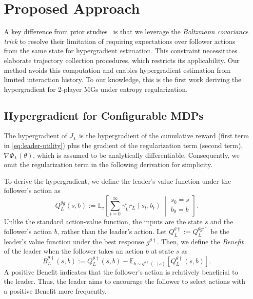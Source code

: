 \documentclass[letterpaper]{article} %
\providecommand{\E}{\mathbb{E}} %
\begin{document}

\section{Proposed Approach}

A key difference from prior studies~\citep{Thoma2024-em,Yang2025-lr} is that we leverage the \emph{Boltzmann covariance trick} to resolve their limitation of requiring expectations over follower actions from the same state for hypergradient estimation.
This constraint necessitates elaborate trajectory collection procedures, which restricts its applicability.
Our method avoids this computation and enables hypergradient estimation from limited interaction history. 
To our knowledge, this is the first work deriving the hypergradient for 2-player MGs under entropy regularization.

\subsection{Hypergradient for Configurable MDPs}

The hypergradient of $J_L$ is the hypergradient of the cumulative reward (first term in \eqref{eq:leader-utility}) plus the gradient of the regularization term (second term), $\nabla \Phi_L({\theta})$, which is assumed to be analytically differentiable. Consequently, we omit the regularization term in the following derivation for simplicity.

To derive the hypergradient, we define the leader's value function under the follower's action as 
\begin{equation*}
    Q_L^{{\theta} {g}}(s, b) :=\E_\tau\left[\sum_{t=0}^\infty\gamma_L^t r_L(s_t,b_t)~\middle|\begin{array}{l}s_0=s\\b_0=b\end{array}\right].
\end{equation*}
Unlike the standard action-value function, the inputs are the state $s$ and the follower's action $b$, rather than the leader's action. 
Let $Q_L^{{\theta} \dagger} := Q_L^{{\theta} {g^{\theta\dagger}}}$ be the leader's value function under the best response $g^{\theta\dagger}$. 
Then, we define the \emph{Benefit} of the leader when the follower takes an action $b$ at state $s$ as
\begin{equation*}
B_L^{{\theta}\dagger}(s, b) := Q_L^{{\theta}\dagger}(s,b)-\E_{b\sim g^{{\theta}\dagger}(\cdot\mid s)}\left[Q_L^{{\theta}\dagger}(s,b)\right].
\end{equation*}
A positive Benefit indicates that the follower's action is relatively beneficial to the leader. 
Thus, the leader aims to encourage the follower to select actions with a positive Benefit more frequently.
\end{document}
